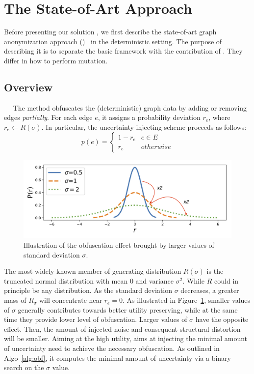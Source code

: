\section{The State-of-Art Approach}
\label{sec:soa}
Before presenting our solution {\methodName}, we first describe the state-of-art graph anonymization approach ({\soaName})~\cite{Boldi_Injecting_2012} in the deterministic setting. 
The purpose of describing it is to separate the basic framework with the contribution of {\methodName}. 
They differ in how to perform mutation. 

\subsection{Overview}~~
The {\soaName} method obfuscates the (deterministic) graph data by adding or removing edges \emph{partially}. 
For each edge $e$, it assigns a probability deviation $r_{e}$, where $r_{e} \leftarrow R(\sigma)$. 
In particular, the uncertainty injecting scheme proceeds as follows:
\begin{equation}
    p(e) =
    \begin{cases}
         1-r_{e}  & e \in E \\
         r_{e}    & otherwise 
    \end{cases}
    \label{eq:inject}
\end{equation}

\begin{figure}[htb]
  \centering
        \includegraphics[width=0.8\linewidth]{ill/std_2.jpg}
  \vspace{-5pt}
  \caption{Illustration of the obfuscation effect brought by larger values of standard deviation $\sigma$.}
  \vspace{-5pt}
  \label{fig:std}
\end{figure} 
The most widely known member of generating distribution $R({\sigma})$ is the truncated normal distribution with mean 0 and variance $\sigma^2$. 
While $R$ could in principle be any distribution.
As the standard deviation $\sigma$ decreases, a greater mass of $R_{\sigma}$ will concentrate near $r_{e}=0$.  
As illustrated in Figure~\ref{fig:std}, smaller values of $\sigma$ generally contributes towards better utility preserving, while at the same time they provide lower level of obfuscation. 
Larger values of $\sigma$ have the opposite effect.
Then, the amount of injected noise and consequent structural distortion will be smaller. 
Aiming at the high utility, {\soaName} aims at injecting the minimal amount of uncertainty need to achieve the necessary obfuscation. 
As outlined in Algo~\ref{alg:obf}, it computes the minimal amount of uncertainty via a binary search on the $\sigma$ value. 


